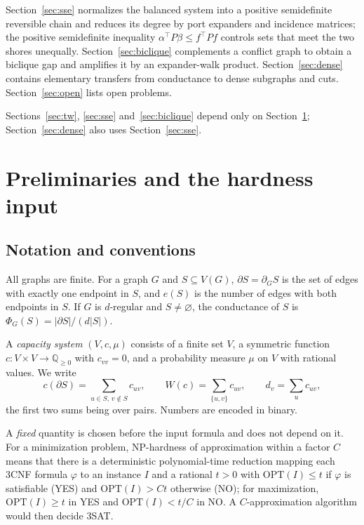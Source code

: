 \documentclass[11pt,letterpaper]{article}
\theoremstyle{definition}
\theoremstyle{remark}
\newcommand{\Q}{\mathbb Q}
\begin{document}
Section~\ref{sec:sse} normalizes the balanced system into a positive
semidefinite reversible chain and reduces its degree by port expanders and
incidence matrices; the positive semidefinite inequality
\(\alpha^\top P\beta\le f^\top Pf\) controls sets that meet the two shores
unequally. Section~\ref{sec:biclique} complements a conflict graph to
obtain a biclique gap and amplifies it by an expander-walk product.
Section~\ref{sec:dense} contains elementary transfers from conductance to
dense subgraphs and cuts. Section~\ref{sec:open} lists open problems.

Sections~\ref{sec:tw}, \ref{sec:sse} and~\ref{sec:biclique} depend only on
Section~\ref{sec:prelim}; Section~\ref{sec:dense} also uses
Section~\ref{sec:sse}.

\section{Preliminaries and the hardness input}\label{sec:prelim}

\subsection{Notation and conventions}

All graphs are finite. For a graph \(G\) and \(S\subseteq V(G)\), \(\partial
S=\partial_GS\) is the set of edges with exactly one endpoint in \(S\), and
\(e(S)\) is the number of edges with both endpoints in \(S\). If \(G\) is
\(d\)-regular and \(S\ne\varnothing\), the conductance of \(S\) is
\(\Phi_G(S)=|\partial S|/(d|S|)\).

A \emph{capacity system} \((V,c,\mu)\) consists of a finite set \(V\), a
symmetric function \(c:V\times V\to\Q_{\ge0}\) with \(c_{vv}=0\), and a
probability measure \(\mu\) on \(V\) with rational values. We write
\[
c(\partial S)=\sum_{u\in S,\,v\notin S}c_{uv},\qquad
W(c)=\sum_{\{u,v\}}c_{uv},\qquad d_v=\sum_uc_{uv},
\]
the first two sums being over pairs. Numbers are encoded in binary.

A \emph{fixed} quantity is chosen before the input formula and does not
depend on it. For a minimization problem, NP-hardness of approximation
within a factor \(C\) means that there is a deterministic polynomial-time
reduction mapping each 3CNF formula \(\varphi\) to an instance \(I\) and a
rational \(t>0\) with \(\mathrm{OPT}(I)\le t\) if \(\varphi\) is satisfiable
(YES) and \(\mathrm{OPT}(I)>Ct\) otherwise (NO); for maximization,
\(\mathrm{OPT}(I)\ge t\) in YES and \(\mathrm{OPT}(I)<t/C\) in NO. A
\(C\)-approximation algorithm would then decide 3SAT.
\end{document}
